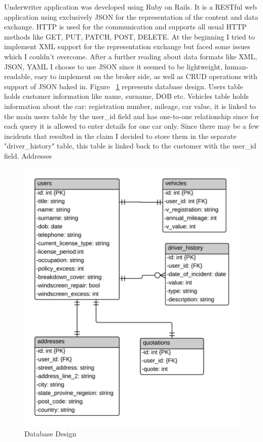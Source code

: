 \documentclass[10pt,a4paper,headinclude=true,twoside]{report}
\begin{document}
Underwriter application was developed using Ruby on Rails. It is a RESTful web application using exclusively JSON for the representation of the content and data exchange. HTTP is used for the communication and supports all usual HTTP methods like GET, PUT, PATCH, POST, DELETE. At the beginning I tried to implement XML support for the representation exchange but faced some issues which I couldn't overcome. After a further reading about data formats like XML, JSON, YAML I choose to use JSON since it seemed to be lightweight, human-readable, easy to implement on the broker side, as well as CRUD operations with support of JSON baked in. Figure ~\ref{fig:DatabaseDesign} represents database design. Users table holds customer information like name, surname, DOB etc. Vehicles table holds information about the car: registration number, mileage, car value, it is linked to the main users table by the user\_id field and has one-to-one relationship since for each query it is allowed to enter details for one car only. Since there may be a few incidents that resulted in the claim I decided to store them in the separate "driver\_history" table, this table is linked back to the customer with the user\_id field. Addresses

\begin{figure}[H]
\centering
\centerline{\includegraphics[scale=0.198]{./DatabaseDesign}}
\caption{Database Design}
\label{fig:DatabaseDesign}
\end{figure}
\end{document}
